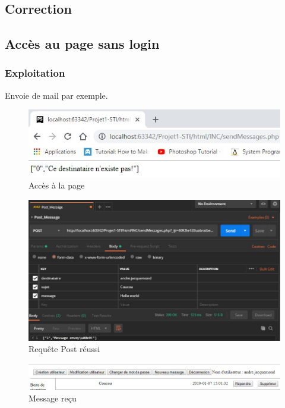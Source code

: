 \documentclass[12pt]{article}
\begin{document}
\subsection{Correction}


\subsection{Accès au page sans login}
\subsubsection{Exploitation}
Envoie de mail par exemple.
\begin{figure}[H]
\centering
\includegraphics{images/withoutLogin.jpg}
\caption{Accès à la page}
\end{figure}
\begin{figure}[H]
\centering
\includegraphics[width=\linewidth]{images/postmanSendMessage.jpg}
\caption{Requête Post réussi}
\end{figure}
\begin{figure}[H]
\centering
\includegraphics[width=\linewidth]{images/postmanSendMessageSuccess.jpg}
\caption{Message reçu}
\end{figure}
\end{document}
